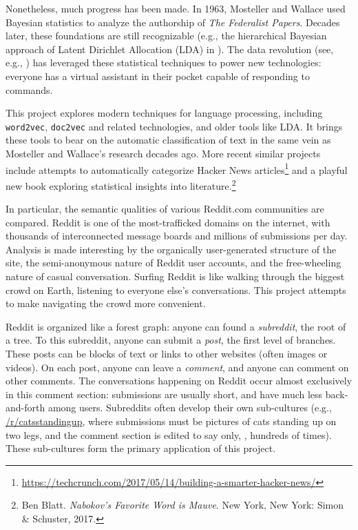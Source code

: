 \documentclass[]{article}
\begin{document}
Nonetheless, much progress has been made. In 1963, Mosteller and Wallace used Bayesian statistics to analyze the authorship of \emph{The Federalist Papers}\cite{Mosteller1963}. Decades later, these foundations are still recognizable (e.g., the hierarchical Bayesian approach of Latent Dirichlet Allocation (LDA) in \cite{Blei2003}). The data revolution (see, e.g., \cite{fourthparadigm}) has leveraged these statistical techniques to power new technologies: everyone has a virtual assistant in their pocket capable of responding to commands.

This project explores modern techniques for language processing, including \texttt{word2vec}, \texttt{doc2vec} and related technologies, and older tools like LDA. It brings these tools to bear on the automatic classification of text in the same vein as Mosteller and Wallace's research decades ago. More recent similar projects include attempts to automatically categorize Hacker News articles\footnote{\url{https://techcrunch.com/2017/05/14/building-a-smarter-hacker-news/}} and a playful new book exploring statistical insights into literature.\footnote{Ben Blatt. \emph{Nabokov's Favorite Word is Mauve}. New York, New York: Simon \& Schuster, 2017.}

In particular, the semantic qualities of various Reddit.com communities are compared. Reddit is one of the most-trafficked domains on the internet, with thousands of interconnected message boards and millions of submissions per day\cite{redditblog:2015}. Analysis is made interesting by the organically user-generated structure of the site, the semi-anonymous nature of Reddit user accounts, and the free-wheeling nature of casual conversation. Surfing Reddit is like walking through the biggest crowd on Earth, listening to everyone else's conversations. This project attempts to make navigating the crowd more convenient.

Reddit is organized like a forest graph: anyone can found a \emph{subreddit}, the root of a tree. To this subreddit, anyone can submit a \emph{post}, the first level of branches. These posts can be blocks of text or links to other websites (often images or videos). On each post, anyone can leave a \emph{comment}, and anyone can comment on other comments. The conversations happening on Reddit occur almost exclusively in this comment section: submissions are usually short, and have much less back-and-forth among users. Subreddits often develop their own sub-cultures (e.g., \href{https://reddit.com/r/catsstandingup}{/r/catsstandingup}, where submissions must be pictures of cats standing up on two legs, and the comment section is edited to say only, , hundreds of times). These sub-cultures form the primary application of this project.
\end{document}
